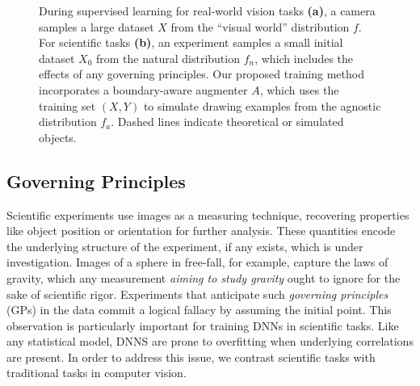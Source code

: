 \documentclass[10pt, journal]{IEEEtran}
\begin{document}
\begin{figure}
  \centering
  \hfill
  \caption{During supervised learning for real-world vision tasks \textbf{(a)},
    a camera samples a large dataset $X$ from the ``visual world'' distribution
    $f$. For scientific tasks \textbf{(b)}, an experiment samples a small
    initial dataset $X_0$ from the natural distribution $f_n$, which includes
    the effects of any governing principles. Our proposed training method
    incorporates a boundary-aware augmenter $A$, which uses the training set
    $(X,Y)$ to simulate drawing examples from the agnostic distribution
    $f_a$. Dashed lines indicate theoretical or simulated objects.}
  \label{fig:dependency-graphs}
\end{figure}

\subsection{Governing Principles}
\label{sec:governing-principles}

Scientific experiments use images as a measuring technique, recovering
properties like object position or orientation for further analysis. These
quantities encode the underlying structure of the experiment, if any exists,
which is under investigation. Images of a sphere in free-fall, for example,
capture the laws of gravity, which any measurement \emph{aiming to study
  gravity} ought to ignore for the sake of scientific rigor. Experiments that
anticipate such \emph{governing principles} (GPs) in the data commit a logical
fallacy by assuming the initial point. This observation is particularly
important for training DNNs in scientific tasks. Like any statistical model,
DNNS are prone to overfitting when underlying correlations are present. In order
to address this issue, we contrast scientific tasks with traditional tasks in
computer vision.
\end{document}

